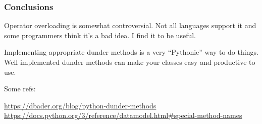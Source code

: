 \documentclass[10pt]{beamer}
\begin{document}
\begin{frame}
  \frametitle{Conclusions}
  
   Operator overloading is somewhat controversial. Not all languages
   support it and some programmers think it's a bad idea. I find it 
   to be useful.
   
   \vspace{5mm}
   Implementing appropriate dunder methods is a very ``Pythonic'' way to
   do things. Well implemented dunder methods can make your classes easy 
   and productive to use.
   
   \vspace{5mm}
   Some refs:
   
   \url{https://dbader.org/blog/python-dunder-methods}
   \url{https://docs.python.org/3/reference/datamodel.html\#special-method-names}
        
\end{frame}
\end{document}

